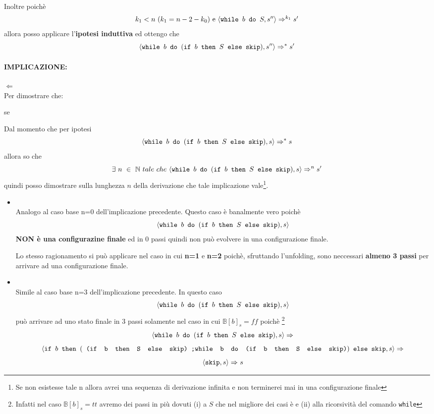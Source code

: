 {\begin{itemize}
	Inoltre poichè \[ k_1<n~(k_1=n-2-k_0)$ e $\confSs{\wbS{b}{S}}{s''}\Rar{k_1}s' \]
	allora posso applicare l'\textbf{ipotesi induttiva} ed ottengo che
	\[ \confSs{\wbS{b}{(\ifABC{b}{S}{\skipistr})}}{s''}\Rar{*}s' \]
\end{itemize}
	\paragraph{IMPLICAZIONE: } $\Longleftarrow{}$ \\
	Per dimostrare che:
	\begin{center}
	se \exFourRtL{}
	\end{center}
	Dal momento che per ipotesi \[ \confSs{\wbS{b}
		{(\ifABC{b}{S}{\skipistr})}}{s}\Rar{*}s \] allora so che 
	\[ \exists{}~n~\in~\mathbb{N}~tale~che~\confSs{\wbS{b}
		{(\ifABC{b}{S}{\skipistr})}}{s}\Rar{n}s'  \]quindi
	posso dimostrare sulla lunghezza $n$ della derivazione che tale
	implicazione vale\footnote{Se non esistesse tale n allora avrei una sequenza 
	di derivazione infinita e non terminerei mai in una configurazione finale}.\\
    
\begin{itemize}

\item	{}\\
 Analogo al caso base n=0 dell'implicazione precedente. Questo
	caso è banalmente vero poichè
	 \[ \exFourRS{} \] \textbf{NON è una configurazine finale }ed
	in 0 passi quindi non può evolvere in una configurazione finale. 

	Lo stesso
	ragionamento si può applicare nel caso in cui \textbf{n=1} e \textbf{n=2}
	poichè, sfruttando l'unfolding, sono neccessari \textbf{almeno 3 passi} per arrivare
	ad una configurazione finale.\\

\item	{} \\
	
	Simile al caso base n=3 dell'implicazione precedente.
	In	questo caso 
\[ 		\exFourRS{}  \]
può arrivare ad uno stato finale
	in 3 passi solamente nel caso in cui $\mathbb{B}[b]_s=ff$ poichè
	\footnote{Infatti nel caso $\mathbb{B}[b]_s=tt$ avremo dei passi in più 
	dovuti (i) a $S$ che nel migliore dei casi è \skipistr{} e (ii) alla
	ricorsività del comando \texttt{while}}
\[ 	\exFourRS\Rar{} \]
	{\small
\[ 	\confSs{
		\ifABC{b}
			{(\concat{
				(\ifABC{b}{S}{\skipistr})
			}{\wbS{b}{(\ifABC{b}{S}{\skipistr})}{}})}
			{\skipistr}
	}{s}\Rar{} \]
	}
	\[ \confSs{\skipistr}{s}\Rar{}s  \]



\end{itemize}}
